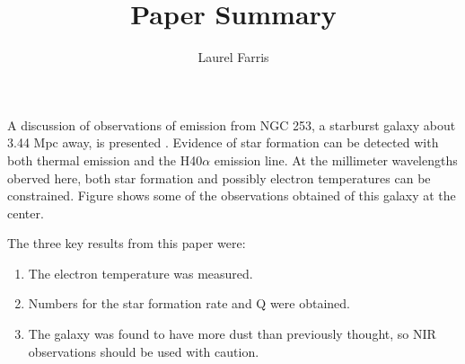 \documentclass{aastex}
\begin{document}
\title{Paper Summary}
\author{Laurel Farris}

\maketitle

A discussion of observations of emission from NGC 253, a starburst galaxy
about 3.44 Mpc away, is presented \cite{paper}. Evidence of star formation 
can be detected with both thermal emission and the H40$\alpha$ emission line.
At the millimeter wavelengths oberved here, both star formation and possibly 
electron temperatures can be constrained. Figure 
shows some of the 
observations obtained of this galaxy at the center.



The three key results from this paper were:
\begin{enumerate}
    \item The electron temperature was measured.
    \item Numbers for the star formation rate and Q were obtained.
    \item The galaxy was found to have more dust than previously thought,
            so NIR observations should be used with caution.
\end{enumerate}


\end{document}
